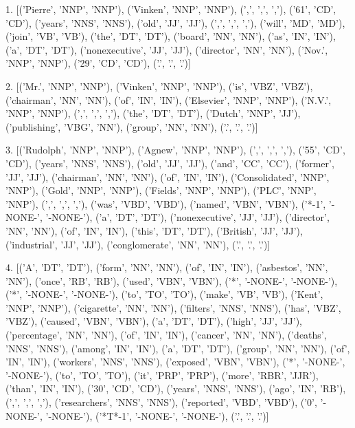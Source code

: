 \documentclass{article}
\begin{document}
1. [('Pierre', 'NNP', 'NNP'), ('Vinken', 'NNP', 'NNP'), (',', ',', ','), ('61', 'CD', 'CD'), ('years', 'NNS', 'NNS'), ('old', 'JJ', 'JJ'), (',', ',', ','), ('will', 'MD', 'MD'), ('join', 'VB', 'VB'), ('the', 'DT', 'DT'), ('board', 'NN', 'NN'), ('as', 'IN', 'IN'), ('a', 'DT', 'DT'), ('nonexecutive', 'JJ', 'JJ'), ('director', 'NN', 'NN'), ('Nov.', 'NNP', 'NNP'), ('29', 'CD', 'CD'), ('.', '.', '.')]

2. [('Mr.', 'NNP', 'NNP'), ('Vinken', 'NNP', 'NNP'), ('is', 'VBZ', 'VBZ'), ('chairman', 'NN', 'NN'), ('of', 'IN', 'IN'), ('Elsevier', 'NNP', 'NNP'), ('N.V.', 'NNP', 'NNP'), (',', ',', ','), ('the', 'DT', 'DT'), ('Dutch', 'NNP', 'JJ'), ('publishing', 'VBG', 'NN'), ('group', 'NN', 'NN'), ('.', '.', '.')]

3. [('Rudolph', 'NNP', 'NNP'), ('Agnew', 'NNP', 'NNP'), (',', ',', ','), ('55', 'CD', 'CD'), ('years', 'NNS', 'NNS'), ('old', 'JJ', 'JJ'), ('and', 'CC', 'CC'), ('former', 'JJ', 'JJ'), ('chairman', 'NN', 'NN'), ('of', 'IN', 'IN'), ('Consolidated', 'NNP', 'NNP'), ('Gold', 'NNP', 'NNP'), ('Fields', 'NNP', 'NNP'), ('PLC', 'NNP', 'NNP'), (',', ',', ','), ('was', 'VBD', 'VBD'), ('named', 'VBN', 'VBN'), ('*-1', '-NONE-', '-NONE-'), ('a', 'DT', 'DT'), ('nonexecutive', 'JJ', 'JJ'), ('director', 'NN', 'NN'), ('of', 'IN', 'IN'), ('this', 'DT', 'DT'), ('British', 'JJ', 'JJ'), ('industrial', 'JJ', 'JJ'), ('conglomerate', 'NN', 'NN'), ('.', '.', '.')]

4. [('A', 'DT', 'DT'), ('form', 'NN', 'NN'), ('of', 'IN', 'IN'), ('asbestos', 'NN', 'NN'), ('once', 'RB', 'RB'), ('used', 'VBN', 'VBN'), ('*', '-NONE-', '-NONE-'), ('*', '-NONE-', '-NONE-'), ('to', 'TO', 'TO'), ('make', 'VB', 'VB'), ('Kent', 'NNP', 'NNP'), ('cigarette', 'NN', 'NN'), ('filters', 'NNS', 'NNS'), ('has', 'VBZ', 'VBZ'), ('caused', 'VBN', 'VBN'), ('a', 'DT', 'DT'), ('high', 'JJ', 'JJ'), ('percentage', 'NN', 'NN'), ('of', 'IN', 'IN'), ('cancer', 'NN', 'NN'), ('deaths', 'NNS', 'NNS'), ('among', 'IN', 'IN'), ('a', 'DT', 'DT'), ('group', 'NN', 'NN'), ('of', 'IN', 'IN'), ('workers', 'NNS', 'NNS'), ('exposed', 'VBN', 'VBN'), ('*', '-NONE-', '-NONE-'), ('to', 'TO', 'TO'), ('it', 'PRP', 'PRP'), ('more', 'RBR', 'JJR'), ('than', 'IN', 'IN'), ('30', 'CD', 'CD'), ('years', 'NNS', 'NNS'), ('ago', 'IN', 'RB'), (',', ',', ','), ('researchers', 'NNS', 'NNS'), ('reported', 'VBD', 'VBD'), ('0', '-NONE-', '-NONE-'), ('*T*-1', '-NONE-', '-NONE-'), ('.', '.', '.')]
\end{document}
